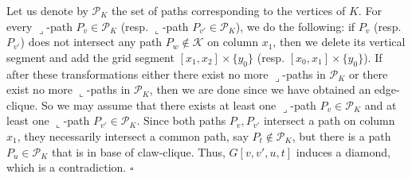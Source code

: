 \documentclass[9pt]{entcs}
\begin{document}
\begin{pf}
Let us denote by  $\mathcal{P}_K$ the set of paths corresponding to the vertices of $K$. For every ${\displaystyle \lrcorner}$-path $P_v \in \mathcal{P}_K$ (resp. ${\displaystyle \llcorner}$-path $P_{v'} \in \mathcal{P}_K$), we do the following: if $P_v$ (resp. $P_{v'}$) does not intersect any path $P_w \notin \mathcal{K}$ on column $x_1$, then we delete its vertical segment and add the grid segment $[x_1, x_2]\times\{y_0\}$ (resp. $[x_0, x_1]\times\{y_0\}$). If after these transformations either there exist no more ${\displaystyle \lrcorner}$-paths in $\mathcal{P}_K$ or there exist no more ${\displaystyle \llcorner}$-paths in $\mathcal{P}_K$, then we are done since we have obtained an edge-clique. So we may assume that there exists at least one ${\displaystyle \lrcorner}$-path $P_v \in \mathcal{P}_K$ and at least one ${\displaystyle \llcorner}$-path $P_{v'} \in \mathcal{P}_K$. Since both paths $P_v, P_{v'}$ intersect a path on column $x_1$, they necessarily intersect a common path, say $P_t \notin \mathcal{P}_K$, but there is a path $P_u \in \mathcal{P}_K$ that is in base of claw-clique. Thus, $G[v, v', u, t]$ induces a diamond, which is a contradiction. %
  $\square$\end{pf}  
\end{document}
